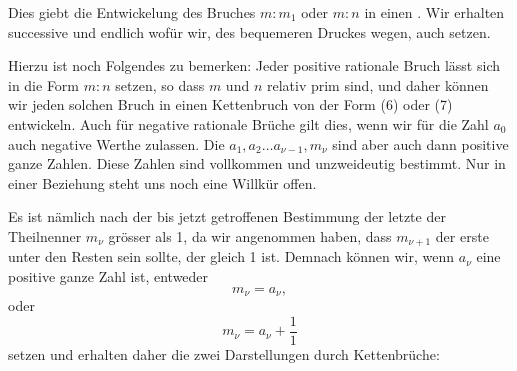 
Dies giebt die Entwickelung des Bruches $m:m_1$ oder $m:n$ in einen . Wir erhalten successive
und endlich
wofür wir, des bequemeren Druckes wegen, auch
setzen.

Hierzu ist noch Folgendes zu bemerken: Jeder positive rationale Bruch lässt sich in die Form $m:n$ setzen, so dass $m$ und $n$ relativ prim sind, und daher können wir jeden solchen Bruch in einen Kettenbruch von der Form (6) oder (7) entwickeln. Auch für negative rationale Brüche gilt dies, wenn wir für die Zahl $a_0$ auch negative Werthe zulassen. Die $a_1, a_2 \ldots a_{\nu-1}, m_\nu$ sind aber auch dann positive ganze Zahlen. Diese Zahlen sind vollkommen und unzweideutig bestimmt. Nur in einer Beziehung steht uns noch eine Willkür offen.

Es ist nämlich nach der bis jetzt getroffenen Bestimmung der letzte der Theilnenner $m_\nu$ grösser als 1, da wir angenommen haben, dass $m_{\nu+1}$ der erste unter den Resten sein sollte, der gleich 1 ist. Demnach können wir, wenn $a_\nu$ eine positive ganze Zahl ist, entweder
\[
m_\nu = a_\nu,
\]
oder
\[
m_\nu = a_\nu + \frac{1}{1}
\]
setzen und erhalten daher die zwei Darstellungen durch Kettenbrüche:
